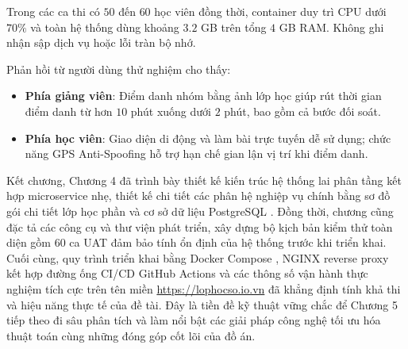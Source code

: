 \documentclass[../DoAn.tex]{subfiles}
\begin{document}
Trong các ca thi có $50$ đến $60$ học viên đồng thời, container  duy trì CPU dưới $70\%$ và toàn hệ thống dùng khoảng $3.2$ GB trên tổng $4$ GB RAM. Không ghi nhận sập dịch vụ hoặc lỗi tràn bộ nhớ.

Phản hồi từ người dùng thử nghiệm cho thấy:
\begin{itemize}
    \item \textbf{Phía giảng viên}: Điểm danh nhóm bằng ảnh lớp học giúp rút thời gian điểm danh từ hơn $10$ phút xuống dưới $2$ phút, bao gồm cả bước đối soát.
    \item \textbf{Phía học viên}: Giao diện di động và làm bài trực tuyến dễ sử dụng; chức năng GPS Anti-Spoofing hỗ trợ hạn chế gian lận vị trí khi điểm danh.
\end{itemize}

Kết chương, Chương 4 đã trình bày thiết kế kiến trúc hệ thống lai phân tầng kết hợp microservice nhẹ, thiết kế chi tiết các phân hệ nghiệp vụ chính bằng sơ đồ gói chi tiết lớp học phần và cơ sở dữ liệu PostgreSQL \cite{postgresql_docs2026}. Đồng thời, chương cũng đặc tả các công cụ và thư viện phát triển, xây dựng bộ kịch bản kiểm thử toàn diện gồm 60 ca UAT đảm bảo tính ổn định của hệ thống trước khi triển khai. Cuối cùng, quy trình triển khai bằng Docker Compose \cite{docker_compose_docs2026}, NGINX reverse proxy \cite{nginx_docs2026} kết hợp đường ống CI/CD GitHub Actions và các thông số vận hành thực nghiệm tích cực trên tên miền \url{https://lophocso.io.vn} đã khẳng định tính khả thi và hiệu năng thực tế của đề tài. Đây là tiền đề kỹ thuật vững chắc để Chương 5 tiếp theo đi sâu phân tích và làm nổi bật các giải pháp công nghệ tối ưu hóa thuật toán cùng những đóng góp cốt lõi của đồ án.
\end{document}
